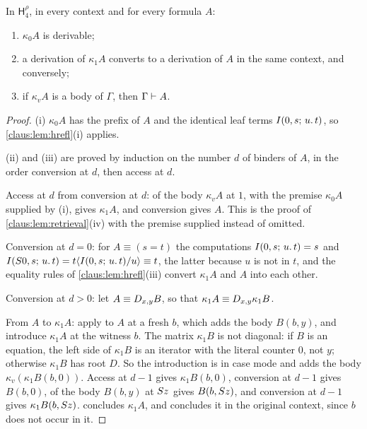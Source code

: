 \begin{lemma}
\label{claus:lem:haccess}
In $\mathsf{H}_4^{\rho}$, in every context and for every formula $A$:
\begin{enumerate}[label=(\roman*)]
\item $\kappa_0A$ is derivable;
\item a derivation of $\kappa_1A$ converts to a derivation of $A$ in the
same context, and conversely;
\item if $\kappa_vA$ is a body of $\Gamma$, then $\Gamma\vdash A$.
\end{enumerate}
\end{lemma}
\begin{proof}
(i) $\kappa_0A$ has the prefix of $A$ and the identical leaf terms
$I(0,s;\,u.\,t)$, so \cref{claus:lem:hrefl}(i) applies.

(ii) and (iii) are proved by induction on the number $d$ of binders of
$A$, in the order conversion at $d$, then access at $d$.

Access at $d$ from conversion at $d$:  of the body
$\kappa_vA$ at $1$, with the premise $\kappa_0A$ supplied by (i), gives
$\kappa_1A$, and conversion gives $A$. This is the proof of
\cref{claus:lem:retrieval}(iv) with the premise supplied instead of
omitted.

Conversion at $d=0$: for $A\equiv(s=t)$ the computations
$I(0,s;\,u.\,t)=s$ and $I(S 0,s;\,u.\,t)=t\langle I(0,s;\,u.\,t)/u\rangle
\equiv t$, the latter because $u$ is not in $t$, and the equality rules of
\cref{claus:lem:hrefl}(iii) convert $\kappa_1A$ and $A$ into each other.

Conversion at $d>0$: let $A\equiv D_{x,y}B$, so that
$\kappa_1A\equiv D_{x,y}\kappa_1B$.

From $A$ to $\kappa_1A$: apply  to $A$ at a fresh $b$, which
adds the body $B(b,y)$, and introduce $\kappa_1A$ at the witness $b$. The
matrix $\kappa_1B$ is not diagonal: if $B$ is an equation, the left side of
$\kappa_1B$ is an iterator with the literal counter $0$, not $y$; otherwise
$\kappa_1B$ has root $D$. So the introduction is in case mode and adds the
body $\kappa_v(\kappa_1B(b,0))$. Access at $d-1$ gives $\kappa_1B(b,0)$,
conversion at $d-1$ gives $B(b,0)$,  of the body $B(b,y)$ at
$S z$ gives $B(b,S z)$, and conversion at $d-1$ gives
$\kappa_1B(b,S z)$.  concludes $\kappa_1A$, and
 concludes it in the original context, since $b$ does not
occur in it.


\end{proof}

